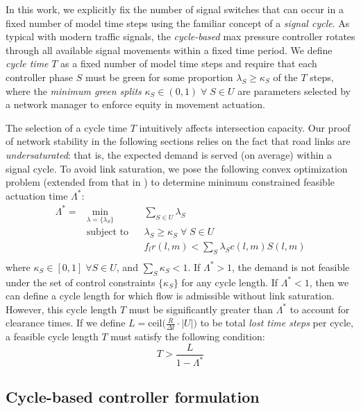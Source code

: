 In this work, we explicitly fix the number of signal switches that can occur in a fixed number of model time steps using the familiar concept of a \emph{signal cycle}. As typical with modern traffic signals, the \emph{cycle-based} max pressure controller rotates through all available signal movements within a fixed time period. We define \emph{cycle time} $T$ as a fixed number of model time steps and require that each controller phase $S$ must be green for some proportion $\lambda_S \geq \kappa_S$ of the $T$ steps, where the \emph{minimum green splits} $\kappa_S \in (0,1) \; \forall \; S \in U $ are parameters selected by a network manager to enforce equity in movement actuation.  

The selection of a cycle time $T$ intuitively affects intersection capacity. Our proof of network stability in the following sections relies on the fact that road links are \emph{undersaturated}: that is, the expected demand is served (on average) within a signal cycle. To avoid link saturation, 
we pose the following convex optimization problem (extended from that in \cite{MaxPressureStochastic}) to determine minimum constrained feasible actuation time $\Lambda^*$:
\begin{equation} \label{sum_lambda}
\begin{aligned}
\Lambda ^{*} = & \min_{\lambda = \{\lambda_S\}}
& & \sum_{S\in U} \lambda_{S} \\
& \text{subject to}
& &  \lambda_{S} \geq \kappa_S \; \forall \; S\in U\\
&&& f_{l}r(l,m) < \sum_{S}\lambda_{S} c(l,m)S(l,m)\\
\end{aligned}
\end{equation}
where $\kappa_S \in [0,1] \; \forall S\in U$, and $\sum_S \kappa_S <1$. If $\Lambda^* > 1$, the demand is not feasible under the set of control constraints $\{\kappa_S\}$ for any cycle length. If $\Lambda^* < 1$, then we can define a cycle length for which flow is admissible without link saturation. However, this cycle length $T$ must be significantly greater than $\Lambda^*$ to account for clearance times. If we define $L = \text{ceil}\big(\frac{R}{\Delta t} \cdot |U|\big)$ to be total \emph{lost time steps} per cycle, a feasible cycle length $T$ must satisfy the following condition: 
\begin{equation} T > \frac{L}{1-\Lambda^*} \label{minTime} \end{equation} 


\subsection*{Cycle-based controller formulation}

